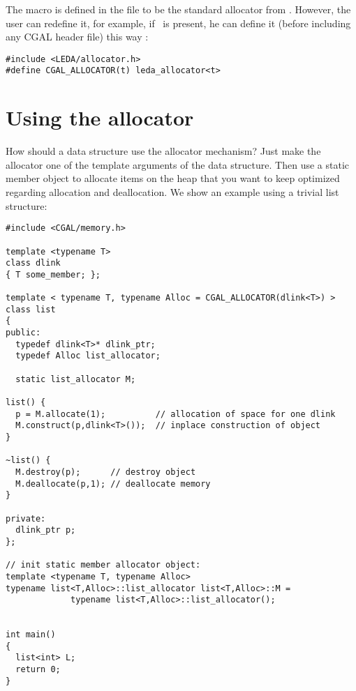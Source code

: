 The macro 
is defined in the file  to be the standard allocator
from .
However, the user can redefine it, for example, if \leda\ is present,
he can define it (before including any CGAL header file) this way :

\begin{verbatim}
#include <LEDA/allocator.h>
#define CGAL_ALLOCATOR(t) leda_allocator<t>
\end{verbatim}

\section{Using the allocator}
\label{sec:using_memory_allocator}

How should a data structure use the allocator mechanism? Just make the
allocator one of the template arguments of the data structure. Then
use a static member object to allocate items on the heap that you
want to keep optimized regarding allocation and deallocation. We
show an example using a trivial list structure:

\begin{verbatim}
#include <CGAL/memory.h>

template <typename T> 
class dlink 
{ T some_member; };

template < typename T, typename Alloc = CGAL_ALLOCATOR(dlink<T>) >
class list 
{
public:
  typedef dlink<T>* dlink_ptr;
  typedef Alloc list_allocator;

  static list_allocator M;

list() {
  p = M.allocate(1);          // allocation of space for one dlink
  M.construct(p,dlink<T>());  // inplace construction of object
}

~list() {
  M.destroy(p);      // destroy object
  M.deallocate(p,1); // deallocate memory
}

private:
  dlink_ptr p;
};

// init static member allocator object:
template <typename T, typename Alloc>
typename list<T,Alloc>::list_allocator list<T,Alloc>::M =
             typename list<T,Alloc>::list_allocator();


int main()
{
  list<int> L;
  return 0;
}
\end{verbatim}

